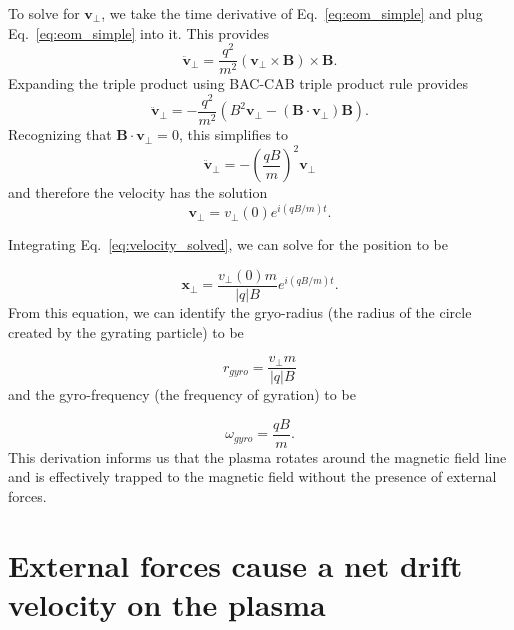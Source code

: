 \documentclass[12pt]{iopart}
\begin{document}
To solve for $\mathbf{v}_\perp$, we take the time derivative of Eq.~\ref{eq:eom_simple} and plug Eq.~\ref{eq:eom_simple} into it.  This provides
\begin{equation*}
\label{eq:eom_simple_2}
\ddot{\mathbf{v}}_\perp = \frac{q^2}{m^2} \left (\mathbf{v}_\perp \times \mathbf{B}  \right) \times \mathbf{B}.
\end{equation*}
Expanding the triple product using BAC-CAB triple product rule provides
\begin{equation*}
\label{eq:eom_simple_3}
\ddot{\mathbf{v}}_\perp = -\frac{q^2}{m^2} \left (B^2 \mathbf{v}_\perp - \left( \mathbf{B} \cdot \mathbf{v}_\perp \right) \mathbf{B} \right).
\end{equation*}
Recognizing that $\mathbf{B} \cdot \mathbf{v}_\perp = 0$, this simplifies to 
\begin{equation*}
\ddot{\mathbf{v}}_\perp = -\left(\frac{qB}{m}\right)^2 \mathbf{v}_\perp 
\end{equation*}
and therefore the velocity has the solution
\begin{equation}
\label{eq:velocity_solved}
\mathbf{v}_\perp = v_\perp(0) e^{i \left(qB/m\right) t}.
\end{equation}

Integrating Eq.~\ref{eq:velocity_solved}, we can solve for the position to be

\begin{equation}
\mathbf{x}_\perp = \frac{v_\perp(0) m}{|q|B} e^{i \left(qB/m\right) t}.
\end{equation}
From this equation, we can identify the gryo-radius (the radius of the circle created by the gyrating particle) to be

\begin{equation}
r_{gyro} = \frac{v_\perp m}{|q|B}
\end{equation}
and the gyro-frequency (the frequency of gyration) to be

\begin{equation}
\omega_{gyro} = \frac{qB}{m}.
\end{equation}
This derivation informs us that the plasma rotates around the magnetic field line and is effectively trapped to the magnetic field without the presence of external forces.  


\section{External forces cause a net drift velocity on the plasma}
\end{document}
